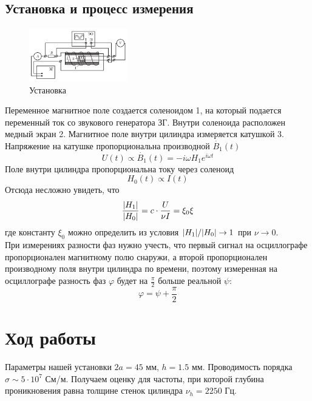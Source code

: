 \documentclass[a4paper, 12pt]{article}
\begin{document}
	\subsection*{Установка и процесс измерения}
	\begin{figure}
		\begin{center}
			\includegraphics[width=0.38\textwidth]{ustanovka}
		\end{center}
		\caption{Установка}\label{fig:ustanovka}
	\end{figure}
	
	Переменное магнитное поле создается соленоидом 1, на который подается переменный ток со звукового генератора ЗГ. Внутри соленоида расположен медный экран 2. Магнитное поле внутри цилиндра измеряется катушкой 3. Напряжение на катушке пропорциональна производной $\dot{B_1}(t)$
	\begin{equation*}
		U(t) \propto \dot{B_1}(t) = -i\omega H_1 e^{i\omega t}
	\end{equation*}
	Поле внутри цилиндра пропорциональна току через соленоид
	\begin{equation*}
		H_0(t) \propto I(t)
	\end{equation*}
	Отсюда несложно увидеть, что
	\begin{equation}
		\frac{\abs{H_1}}{\abs{H_0}} = c \cdot \frac{U}{\nu I} = \xi_0 \xi
		\label{eq:otnoshenie_amplitud}
	\end{equation}
	где константу  $\xi_0$ можно определить из условия $\abs{H_1}/\abs{H_0} \rightarrow 1$ при
	$\nu \rightarrow 0$.\\
	
	При измерениях разности фаз нужно учесть, что первый сигнал на осциллографе
	пропорционален магнитному полю снаружи, а второй пропорционален производному
	поля внутри цилиндра по времени, поэтому измеренная на осциллографе разность фаз $\varphi$ будет на $\frac{\pi}{2}$ больше реальной $\psi$:
	\[\varphi = \psi + \frac{\pi}{2}\]

	\section*{Ход работы}
	Параметры нашей установки $2a = 45$ мм, $h=1.5$ мм. Проводимость порядка
	$\sigma \sim 5\cdot 10^7$ См/м. Получаем оценку для частоты, при которой
	глубина проникновения равна толщине стенок цилиндра $\nu_h = 2250$ Гц.
	
\end{document}

